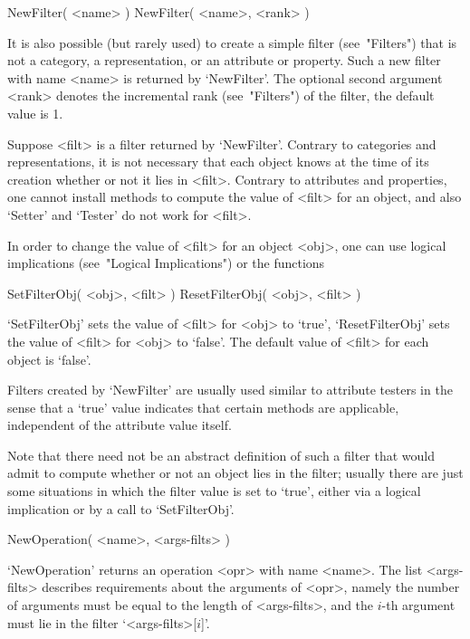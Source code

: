 \>NewFilter( <name> )
\)NewFilter( <name>, <rank> )

It is also possible (but rarely used) to create a simple filter
(see~"Filters") that is not a category, a representation,
or an attribute or property.
Such a new filter with name <name> is returned by `NewFilter'.
The optional second argument <rank> denotes the incremental rank
(see~"Filters") of the filter, the default value is 1.

Suppose <filt> is a filter returned by `NewFilter'.
Contrary to categories and representations, it is not necessary that
each object knows at the time of its creation whether or not it lies in
<filt>.
Contrary to attributes and properties, one cannot install methods to
compute the value of <filt> for an object, and also `Setter' and
`Tester' do not work for <filt>.

In order to change the value of <filt> for an object <obj>,
one can use logical implications (see~"Logical Implications") or
the functions

\>SetFilterObj( <obj>, <filt> )
\>ResetFilterObj( <obj>, <filt> )

`SetFilterObj' sets the value of <filt> for <obj> to `true',
`ResetFilterObj' sets the value of <filt> for <obj> to `false'.
The default value of <filt> for each object is `false'.

Filters created by `NewFilter' are usually used similar to attribute
testers in the sense that a `true' value indicates that certain methods
are applicable, independent of the attribute value itself.

Note that there need not be an abstract definition of such a filter
that would admit to compute whether or not an object lies in the filter;
usually there are just some situations in which the filter value is set
to `true', either via a logical implication or by a call to
`SetFilterObj'.




\>NewOperation( <name>, <args-filts> )

`NewOperation' returns an operation <opr> with name <name>.
The list <args-filts> describes requirements about the arguments
of <opr>, namely the number of arguments must be equal to the length of
<args-filts>, and the $i$-th argument must lie in the filter
`<args-filts>[$i$]'.

